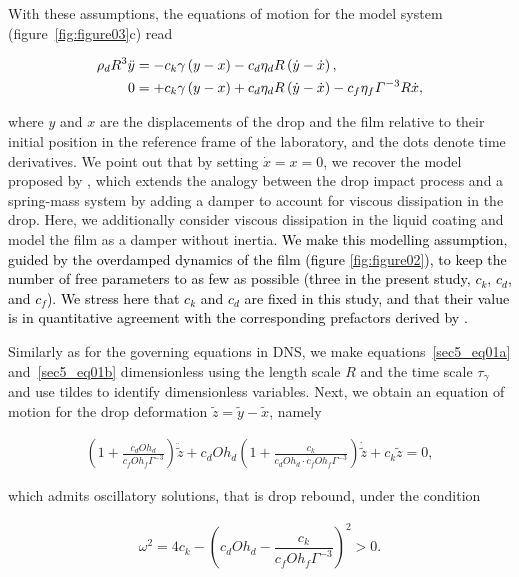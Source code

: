 \documentclass[]{jfm}
\newcommand{\revRev}[1]{\textcolor{black}{#1}}
\newcommand{\Ohd}{\mathit{Oh}_\mathit{d}}
\newcommand{\Ohf}{\mathit{Oh}_\mathit{f}}
\begin{document}
	With these assumptions, the equations of motion for the model system (figure~\ref{fig:figure03}c) read
	
	\begin{align}
		\revRev{\rho_d} R^{3} \ddot{y} &= -c_{k} \gamma \left( y - x \right) - c_{d} \eta_{d} R \left( \dot{y} - \dot{x} \right), \label{sec5_eq01a} \\
		0 &= +c_{k} \gamma \left( y - x \right) + c_{d} \eta_{d} R \left( \dot{y} - \dot{x} \right) - c_{f} \eta_{f} \Gamma^{-3} R \dot{x}, \label{sec5_eq01b}
	\end{align}
	
	\noindent where $y$ and $x$ are the displacements of the drop and the film relative to their initial position in the reference frame of the laboratory, and the dots denote time derivatives. 
	We point out that by setting $\dot{x} = x = 0$, we recover the model proposed by \citet{jha2020viscous}, which extends the analogy between the drop impact process and a spring-mass system \citep{okumura2003water} by adding a damper to account for viscous dissipation in the drop. Here, we additionally consider viscous dissipation in the liquid coating and model the film as a damper without inertia. 
	\revRev{We make this modelling assumption, guided by the overdamped dynamics of the film (figure \ref{fig:figure02}), to keep the number of free parameters to as few as possible (three in the present study, $c_k$, $c_d$, and $c_f$).
		We stress here that $c_k$ and $c_d$ are fixed in this study, and that their value is in quantitative agreement with the corresponding prefactors derived by \citet{jha2020viscous}.}
	
	Similarly as for the governing equations in DNS, we make equations~\eqref{sec5_eq01a} and~\eqref{sec5_eq01b} dimensionless using the length scale $R$ and the time scale $\tau_{\gamma}$ and use tildes to identify dimensionless variables. Next, we obtain an equation of motion for the drop deformation $\tilde{z} = \tilde{y} - \tilde{x}$, namely
	
	\begin{align}
		\left( 1 + \frac{c_{d} \Ohd}{c_{f} \Ohf \Gamma^{-3}} \right) \ddot{\tilde{z}} + c_{d} \Ohd \left( 1 + \frac{c_{k}}{c_{d} \Ohd \cdot c_{f} \Ohf \Gamma^{-3}} \right) \dot{\tilde{z}} + c_{k} \tilde{z} = 0, \label{sec5_eq02}
	\end{align}
	
	\noindent which admits oscillatory solutions, that is drop rebound, under the condition
	
	\begin{align}
		\omega^2 = 4 c_{k} - \left( c_{d} \Ohd  - \dfrac{c_{k}}{c_{f} \Ohf \Gamma^{-3}} \right)^{2} > 0.
		\label{eqn:sec1_Omega2}
	\end{align}
	
\end{document}
